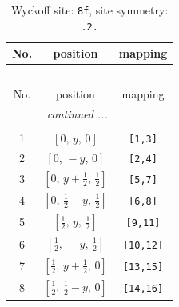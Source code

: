 \documentclass[fleqn,8pt]{jsarticle}
\begin{document}
\begin{longtable}{ccc}
\caption{Wyckoff site: {\tt 8f}, site symmetry: {\tt .2.}}
 \\
 \hline \hline
No. & position & mapping \\ \hline \endfirsthead

\multicolumn{2}{l}{\tablename\ \thetable{}} \\
 \hline \hline
No. & position & mapping \\ \hline \endhead

 \hline \hline
\multicolumn{2}{r}{\footnotesize\it continued ...} \\ \endfoot

 \hline \hline
\multicolumn{2}{r}{} \\ \endlastfoot

1 & $\left[ 0,\, y,\, 0 \right]$ & {\tt [1,3]} \\ \hline
2 & $\left[ 0,\, - y,\, 0 \right]$ & {\tt [2,4]} \\ \hline
3 & $\left[ 0,\, y + \frac{1}{2},\, \frac{1}{2} \right]$ & {\tt [5,7]} \\ \hline
4 & $\left[ 0,\, \frac{1}{2} - y,\, \frac{1}{2} \right]$ & {\tt [6,8]} \\ \hline
5 & $\left[ \frac{1}{2},\, y,\, \frac{1}{2} \right]$ & {\tt [9,11]} \\ \hline
6 & $\left[ \frac{1}{2},\, - y,\, \frac{1}{2} \right]$ & {\tt [10,12]} \\ \hline
7 & $\left[ \frac{1}{2},\, y + \frac{1}{2},\, 0 \right]$ & {\tt [13,15]} \\ \hline
8 & $\left[ \frac{1}{2},\, \frac{1}{2} - y,\, 0 \right]$ & {\tt [14,16]} \\
\end{longtable}
\renewcommand{\arraystretch}{1.2}
\end{document}
